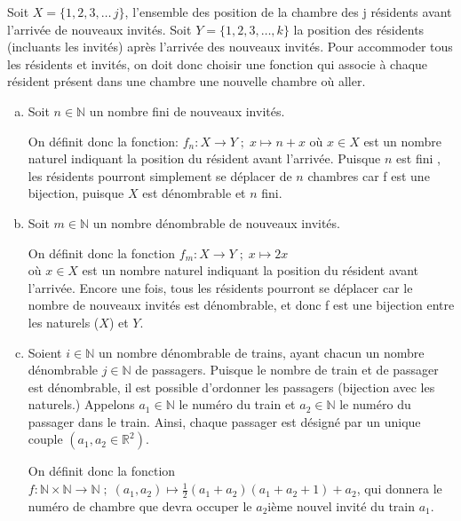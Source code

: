 \documentclass[letterpaper,12pt,oneside,final]{book}
\begin{document}
    Soit $X= \{1, 2, 3, \dots\, j\}$, l'ensemble des position de la chambre des j résidents avant l'arrivée de nouveaux invités. 
    Soit $Y = \{1,2,3,\dots, k\}$ la position des résidents (incluants les invités) après l'arrivée des nouveaux invités.
    Pour accommoder tous les résidents et invités, on doit donc choisir une fonction qui associe à chaque résident présent dans une chambre
    une nouvelle chambre où aller.\\
    \begin{enumerate}[a)]
    \item %
    
    Soit $n \in \mathbb{N}$ un nombre fini de nouveaux invités. 
    
    On définit donc la fonction: $f_n: X \rightarrow Y\; ;\; x\mapsto n + x$
    où $x\in X$ est un nombre naturel indiquant la position du résident avant l'arrivée. Puisque $n$ est fini
    , les résidents pourront simplement se déplacer de $n$ chambres car f est une bijection, puisque $X$ est dénombrable et $n$ fini. 

    
    
    \item %
    
    Soit $m \in \mathbb{N}$ un nombre dénombrable de nouveaux invités. 

    On définit donc la fonction $f_m: X\rightarrow Y\;; \;x\mapsto 2x$\\
    où $x\in X$ est un nombre naturel indiquant la position du résident avant l'arrivée. Encore une fois,
    tous les résidents pourront se déplacer car le nombre de nouveaux invités est dénombrable, et donc f est une bijection entre
    les naturels ($X$) et $Y$.


    
    
    \item %
    Soient $i \in \mathbb{N}$ un nombre dénombrable de trains, ayant chacun un nombre dénombrable $j \in \mathbb{N}$
    de passagers. Puisque le nombre de train et de passager est dénombrable, il est possible d'ordonner les passagers (bijection avec les naturels.)
    Appelons $a_1 \in \mathbb{N}$ le numéro du train et $a_2 \in \mathbb{N}$ le numéro du passager dans le train. Ainsi,
    chaque passager est désigné par un unique couple $(a_1,a_2 \in \mathbb{R}^2)$.
    
    On définit donc la fonction $f: \mathbb{N} \times \mathbb{N} \rightarrow \mathbb{N} \; ;\;
    (a_1,a_2)\mapsto \frac{1}{2}(a_1+a_2)(a_1+a_2+1) + a_2$, qui donnera le numéro de chambre que devra occuper le $a_2$ième nouvel invité du train
    $a_1$. 



    
    
    \end{enumerate}
\end{document}
